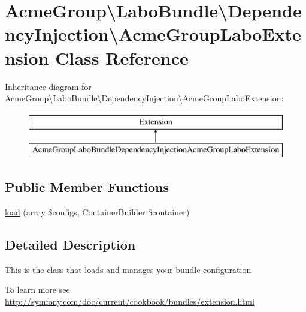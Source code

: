 \hypertarget{class_acme_group_1_1_labo_bundle_1_1_dependency_injection_1_1_acme_group_labo_extension}{\section{Acme\+Group\textbackslash{}Labo\+Bundle\textbackslash{}Dependency\+Injection\textbackslash{}Acme\+Group\+Labo\+Extension Class Reference}
\label{class_acme_group_1_1_labo_bundle_1_1_dependency_injection_1_1_acme_group_labo_extension}
}
Inheritance diagram for Acme\+Group\textbackslash{}Labo\+Bundle\textbackslash{}Dependency\+Injection\textbackslash{}Acme\+Group\+Labo\+Extension\+:\begin{figure}[H]
\begin{center}
\leavevmode
\includegraphics[height=2.000000cm]{class_acme_group_1_1_labo_bundle_1_1_dependency_injection_1_1_acme_group_labo_extension}
\end{center}
\end{figure}
\subsection*{Public Member Functions}
\begin{DoxyCompactItemize}
\item 
\hyperlink{class_acme_group_1_1_labo_bundle_1_1_dependency_injection_1_1_acme_group_labo_extension_a04164a03a9c69857b794c30b4dffdd6f}{load} (array \$configs, Container\+Builder \$container)
\end{DoxyCompactItemize}


\subsection{Detailed Description}
This is the class that loads and manages your bundle configuration

To learn more see \hyperlink{}{http\+://symfony.\+com/doc/current/cookbook/bundles/extension.\+html} 

